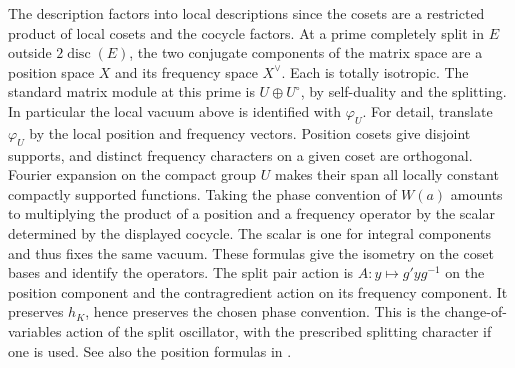 \documentclass[a4paper,11pt]{article}
\theoremstyle{definition}
\theoremstyle{remark}
\numberwithin{equation}{section}
\begin{document}
The description factors into local descriptions since the cosets
are a restricted product of local cosets and the cocycle factors.
At a prime completely split in \(E\) outside \(2\operatorname{disc}(E)\),
the two conjugate components of the matrix space are a position
space \(X\) and its frequency space \(X^\vee\). Each is totally
isotropic. The standard matrix module at this prime is
\(U\oplus U^\circ\), by self-duality and the splitting.
In particular the local vacuum above is identified with
\(\varphi_U\). For detail, translate \(\varphi_U\) by the local
position and frequency vectors. Position cosets give disjoint
supports, and distinct frequency characters on a given coset
are orthogonal. Fourier expansion on the compact group \(U\)
makes their span all locally constant compactly supported
functions. Taking the phase convention of \(W(a)\) amounts to
multiplying the product of a position and a frequency operator by
the scalar determined by the displayed cocycle. The scalar is one
for integral components and thus fixes the same vacuum. These
formulas give the isometry on the coset bases and identify the
operators. The split pair action is
\(A:y\mapsto g' y g^{-1}\) on the position component and the
contragredient action on its frequency component. It preserves
\(h_K\), hence preserves the chosen phase convention.
This is the change-of-variables action of the split oscillator,
with the prescribed splitting character if one is used.
See also the position formulas in \cite{XIII-X-IV-gan,XIII-X-IV-kudla29}.
\end{document}
